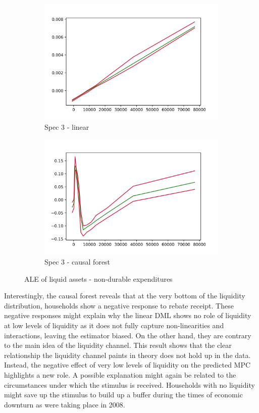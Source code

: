 \begin{figure}[t]
    \centering
    \begin{subfigure}{0.5\textwidth}
        \includegraphics[width=\textwidth]{figures/ALE/chNDexp/spec3_linear_liqassii.png}
        \caption{Spec 3 - linear}
    \end{subfigure}%
    \begin{subfigure}{0.5\textwidth}
        \includegraphics[width=\textwidth]{figures/ALE/chNDexp/spec3_cf_liqassii.png}
        \caption{Spec 3 - causal forest}
    \end{subfigure}
    \caption{ALE of liquid assets - non-durable expenditures}
    \label{fig:ale_liquid}
\end{figure}
Interestingly, the causal forest reveals that at the very bottom of the liquidity distribution, households show a negative response to rebate receipt. These negative responses might explain why the linear DML shows no role of liquidity at low levels of liquidity as it does not fully capture non-linearities and interactions, leaving the estimator biased. On the other hand, they are contrary to the main idea of the liquidity channel. This result shows that the clear relationship the liquidity channel paints in theory does not hold up in the data. Instead, the negative effect of very low levels of liquidity on the predicted MPC highlights a new role. A possible explanation might again be related to the circumstances under which the stimulus is received. Households with no liquidity might save up the stimulus to build up a buffer during the times of economic downturn as were taking place in 2008. \\

